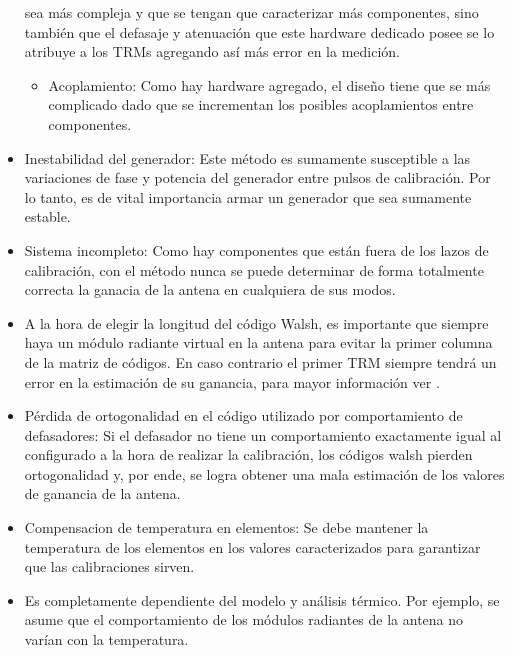 \begin{itemize}
		sea más compleja y que se tengan que caracterizar más componentes, sino también que el defasaje y atenuación que este 
		hardware dedicado posee se lo atribuye a los TRMs agregando así más error en la medición. 
	\begin{itemize}
		\item Acoplamiento: Como hay hardware agregado, el diseño tiene que se más complicado dado que se incrementan los posibles 
			acoplamientos entre componentes.
	\end{itemize}
	\item Inestabilidad del generador: Este método es sumamente susceptible a las variaciones de fase y potencia del generador 
		entre pulsos de calibración. Por lo tanto, es de vital importancia armar un generador que sea sumamente estable.
	\item Sistema incompleto: Como hay componentes que están fuera de los lazos de calibración, con el método nunca se puede 
		determinar de forma totalmente correcta la ganacia de la antena en cualquiera de sus modos.
	\item A la hora de elegir la longitud del código Walsh, es importante que siempre haya un módulo radiante virtual en la 
		antena para evitar la primer columna de la matriz de códigos. En caso contrario el primer TRM siempre tendrá un error en 
		la estimación de su ganancia, para mayor información ver \cite{Wang2010}.
	\item Pérdida de ortogonalidad en el código utilizado por comportamiento de defasadores: Si el defasador no tiene un 
		comportamiento exactamente igual al configurado a la hora de realizar la calibración, los códigos walsh pierden 
		ortogonalidad y, por ende, se logra obtener una mala estimación de los valores de ganancia de la antena. 
    \item Compensacion de temperatura en elementos: Se debe mantener la temperatura de los elementos en los valores 
        caracterizados para garantizar que las calibraciones sirven.
    \item Es completamente dependiente del modelo y análisis térmico. Por ejemplo, se asume que el comportamiento de los 
        módulos radiantes de la antena no varían con la temperatura.
\end{itemize}

